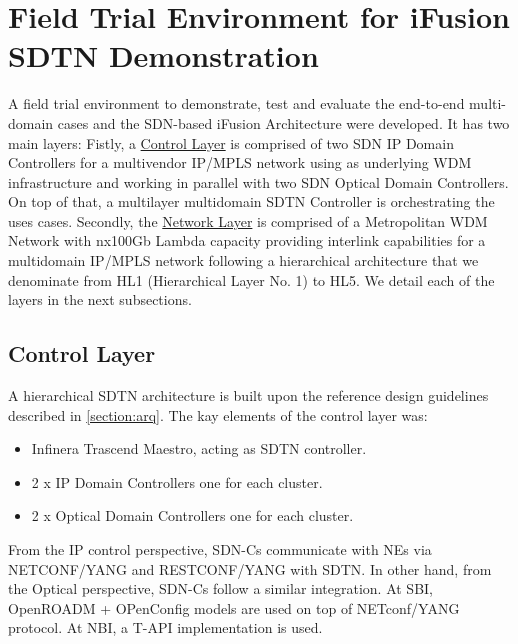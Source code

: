 \documentclass[a4paper,fleqn]{cas-dc}
\begin{document}
\section{Field Trial Environment for iFusion SDTN Demonstration}
\label{section:trial}

A field trial environment to demonstrate, test and evaluate the end-to-end multi-domain cases and the SDN-based iFusion Architecture were developed. It has two main layers: Fistly, a \hyperref[sec:contol_lay]{Control Layer} is comprised of two SDN IP Domain Controllers for a multivendor IP/MPLS network using as underlying WDM infrastructure and working in parallel with two SDN Optical Domain Controllers. On top of that, a multilayer multidomain SDTN Controller is orchestrating the uses cases. Secondly, the \hyperref[sec:net_lay]{Network Layer} is comprised of a Metropolitan WDM Network with nx100Gb Lambda capacity providing interlink capabilities for a multidomain IP/MPLS network following a hierarchical architecture that we denominate from HL1 (Hierarchical Layer No. 1) to HL5. We detail each of the layers in the next subsections. 

\subsection{Control Layer}
\label{sec:contol_lay}
A hierarchical SDTN architecture is built upon the reference design guidelines described in \cref{section:arq}. The kay elements of the control layer was:
\begin{itemize}
    \item Infinera Trascend Maestro, acting as SDTN controller.
    \item 2 x IP Domain Controllers one for each cluster.
    \item 2 x Optical Domain Controllers one for each cluster.
\end{itemize}

From the IP control perspective, SDN-Cs communicate with NEs via NETCONF/YANG and RESTCONF/YANG with SDTN.  In other hand, from the Optical perspective, SDN-Cs follow a similar integration. At SBI, OpenROADM + OPenConfig models are used on top of NETconf/YANG protocol. At NBI, a T-API implementation is used.  
\end{document}
